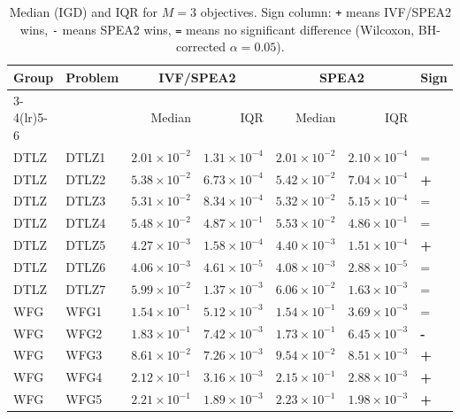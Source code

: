 \begin{table}[t]
\centering
\caption{Median (IGD) and IQR for $M=3$ objectives. Sign column: \texttt{+} means IVF/SPEA2 wins, \texttt{-} means SPEA2 wins, \texttt{=} means no significant difference (Wilcoxon, BH-corrected $\alpha=0.05$).}
\label{tab:igd_m3_ivfspea2}
\scriptsize
\begin{tabular}{llrrrrl}
\toprule
Group & Problem & \multicolumn{2}{c}{IVF/SPEA2} & \multicolumn{2}{c}{SPEA2} & Sign \\
\cmidrule(lr){3-4}\cmidrule(lr){5-6}
 & & Median & IQR & Median & IQR & \\
\midrule
DTLZ & DTLZ1 & $2.01\!\times\!10^{-2}$ & $1.31\!\times\!10^{-4}$ & $2.01\!\times\!10^{-2}$ & $2.10\!\times\!10^{-4}$ & = \\
DTLZ & DTLZ2 & $5.38\!\times\!10^{-2}$ & $6.73\!\times\!10^{-4}$ & $5.42\!\times\!10^{-2}$ & $7.04\!\times\!10^{-4}$ & \textbf{+} \\
DTLZ & DTLZ3 & $5.31\!\times\!10^{-2}$ & $8.34\!\times\!10^{-4}$ & $5.32\!\times\!10^{-2}$ & $5.15\!\times\!10^{-4}$ & = \\
DTLZ & DTLZ4 & $5.48\!\times\!10^{-2}$ & $4.87\!\times\!10^{-1}$ & $5.53\!\times\!10^{-2}$ & $4.86\!\times\!10^{-1}$ & = \\
DTLZ & DTLZ5 & $4.27\!\times\!10^{-3}$ & $1.58\!\times\!10^{-4}$ & $4.40\!\times\!10^{-3}$ & $1.51\!\times\!10^{-4}$ & \textbf{+} \\
DTLZ & DTLZ6 & $4.06\!\times\!10^{-3}$ & $4.61\!\times\!10^{-5}$ & $4.08\!\times\!10^{-3}$ & $2.88\!\times\!10^{-5}$ & = \\
DTLZ & DTLZ7 & $5.99\!\times\!10^{-2}$ & $1.37\!\times\!10^{-3}$ & $6.06\!\times\!10^{-2}$ & $1.63\!\times\!10^{-3}$ & = \\
\addlinespace
WFG & WFG1 & $1.54\!\times\!10^{-1}$ & $5.12\!\times\!10^{-3}$ & $1.54\!\times\!10^{-1}$ & $3.69\!\times\!10^{-3}$ & = \\
WFG & WFG2 & $1.83\!\times\!10^{-1}$ & $7.42\!\times\!10^{-3}$ & $1.73\!\times\!10^{-1}$ & $6.45\!\times\!10^{-3}$ & \textbf{-} \\
WFG & WFG3 & $8.61\!\times\!10^{-2}$ & $7.26\!\times\!10^{-3}$ & $9.54\!\times\!10^{-2}$ & $8.51\!\times\!10^{-3}$ & \textbf{+} \\
WFG & WFG4 & $2.12\!\times\!10^{-1}$ & $3.16\!\times\!10^{-3}$ & $2.15\!\times\!10^{-1}$ & $2.88\!\times\!10^{-3}$ & \textbf{+} \\
WFG & WFG5 & $2.21\!\times\!10^{-1}$ & $1.89\!\times\!10^{-3}$ & $2.23\!\times\!10^{-1}$ & $1.98\!\times\!10^{-3}$ & \textbf{+} \\

\end{tabular}
\end{table}
